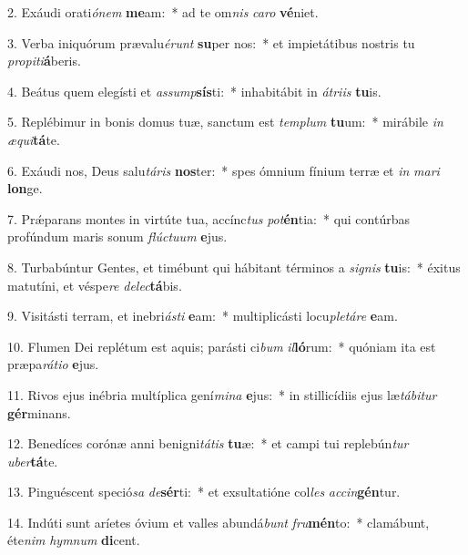 2. Exáudi orati\textit{ó}\textit{nem} \textbf{me}am:~*  ad te om\textit{nis} \textit{ca}\textit{ro} \textbf{vé}niet.\

3. Verba iniquórum prævalu\textit{é}\textit{runt} \textbf{su}per nos:~*  et impietátibus nostris tu \textit{pro}\textit{pi}\textit{ti}\textbf{á}beris.\

4. Beátus quem elegísti et \textit{as}\textit{sump}\textbf{sís}ti:~*  inhabitábit in \textit{á}\textit{tri}\textit{is} \textbf{tu}is.\

5. Replébimur in bonis domus tuæ, sanctum est \textit{tem}\textit{plum} \textbf{tu}um:~*  mirábile \textit{in} \textit{æ}\textit{qui}\textbf{tá}te.\

6. Exáudi nos, Deus salu\textit{tá}\textit{ris} \textbf{nos}ter:~*  spes ómnium fínium terræ et \textit{in} \textit{ma}\textit{ri} \textbf{lon}ge.\

7. Prǽparans montes in virtúte tua, accínc\textit{tus} \textit{pot}\textbf{én}tia:~*  qui contúrbas profúndum maris sonum \textit{flúc}\textit{tu}\textit{um} \textbf{e}jus.\

8. Turbabúntur Gentes, et timébunt qui hábitant términos a \textit{si}\textit{gnis} \textbf{tu}is:~*  éxitus matutíni, et véspe\textit{re} \textit{de}\textit{lec}\textbf{tá}bis.\

9. Visitásti terram, et inebri\textit{ás}\textit{ti} \textbf{e}am:~*  multiplicásti locu\textit{ple}\textit{tá}\textit{re} \textbf{e}am.\

10. Flumen Dei replétum est aquis; parásti ci\textit{bum} \textit{il}\textbf{ló}rum:~*  quóniam ita est præpa\textit{rá}\textit{ti}\textit{o} \textbf{e}jus.\

11. Rivos ejus inébria multíplica gení\textit{mi}\textit{na} \textbf{e}jus:~*  in stillicídiis ejus læ\textit{tá}\textit{bi}\textit{tur} \textbf{gér}minans.\

12. Benedíces corónæ anni benigni\textit{tá}\textit{tis} \textbf{tu}æ:~*  et campi tui replebún\textit{tur} \textit{u}\textit{ber}\textbf{tá}te.\

13. Pinguéscent speció\textit{sa} \textit{de}\textbf{sér}ti:~*  et exsultatióne col\textit{les} \textit{ac}\textit{cin}\textbf{gén}tur.\

14. Indúti sunt aríetes óvium et valles abundá\textit{bunt} \textit{fru}\textbf{mén}to:~*  clamábunt, éte\textit{nim} \textit{hym}\textit{num} \textbf{di}cent.\

